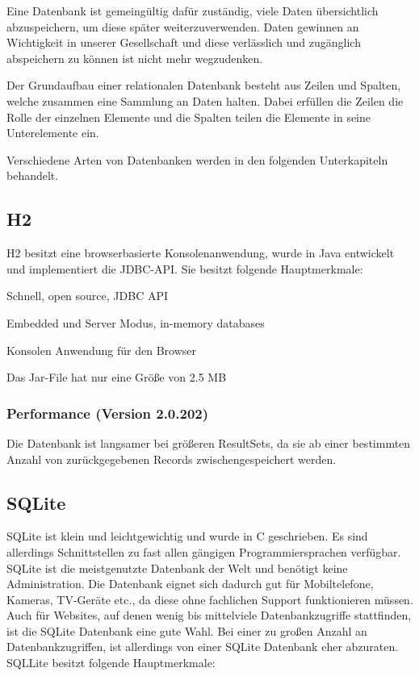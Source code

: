 
Eine Datenbank ist gemeingültig dafür zuständig, viele Daten übersichtlich abzuspeichern, um diese später weiterzuverwenden. Daten gewinnen an Wichtigkeit in unserer Gesellschaft und diese verlässlich und zugänglich abspeichern zu können ist nicht mehr wegzudenken.
 
Der Grundaufbau einer relationalen Datenbank besteht aus Zeilen und Spalten, welche zusammen eine Sammlung an Daten halten. Dabei erfüllen die Zeilen die Rolle der einzelnen Elemente und die Spalten teilen die Elemente in seine Unterelemente ein. \cite{javaInselBuch}
 
 Verschiedene Arten von Datenbanken werden in den folgenden Unterkapiteln behandelt.

\subsection{H2}
H2 besitzt eine browserbasierte Konsolenanwendung, wurde in Java entwickelt und implementiert die JDBC-API. 
Sie besitzt folgende Hauptmerkmale:
\begin{compactitem} 

    \item Schnell, open source, JDBC API
    \item Embedded und Server Modus, in-memory databases        
    \item Konsolen Anwendung für den Browser
    \item Das Jar-File hat nur eine Größe von 2.5 MB
\end{compactitem} 
\cite{databaseComparison}


\subsubsection{Performance (Version 2.0.202)}
Die Datenbank ist langsamer bei größeren ResultSets, da sie ab einer bestimmten Anzahl von zurückgegebenen Records zwischengespeichert werden. \cite{databaseComparison}
 
\subsection{SQLite}
SQLite ist klein und leichtgewichtig und wurde in C geschrieben. Es sind allerdings Schnittstellen zu fast allen gängigen Programmiersprachen verfügbar. 
SQLite ist die meistgenutzte Datenbank der Welt und benötigt keine Administration. Die Datenbank eignet sich dadurch gut für Mobiltelefone, Kameras, TV-Geräte etc., da diese ohne fachlichen Support funktionieren müssen. Auch für Websites, auf denen wenig bis mittelviele Datenbankzugriffe stattfinden, ist die SQLite Datenbank eine gute Wahl. Bei einer zu großen Anzahl an Datenbankzugriffen, ist allerdings von einer SQLite Datenbank eher abzuraten. \cite{databaseComparison}
SQLLite besitzt folgende Hauptmerkmale:

